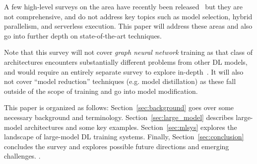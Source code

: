 A few high-level surveys on the area have recently been released~\cite{surveylarge2022,lowmemory2019} but they are not comprehensive, and do not address key topics such as model selection, hybrid parallelism, and serverless execution. This paper will address these areas and also go into further depth on state-of-the-art techniques.

Note that this survey will not cover \textit{graph neural network} training as that class of architectures encounters substantially different problems from other DL models, and would require an entirely separate survey to explore in-depth~\cite{gnnsurvey2021}. It will also not cover ``model reduction'' techniques (e.g. model distillation) as these fall outside of the scope of training and go into model modification.

This paper is organized as follows: Section~\ref{sec:background} goes over some necessary background and terminology. Section~\ref{sec:large_model} describes large-model architectures and some key examples. Section~\ref{sec:mlsys} explores the landscape of large-model DL training systems. Finally, Section~\ref{sec:conclusion} concludes the survey and explores possible future directions and emerging challenges. .




